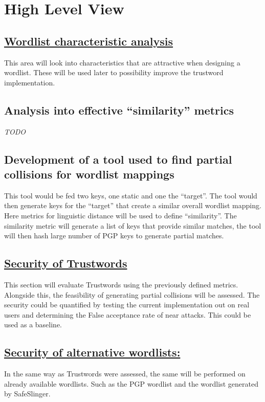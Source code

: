 

\newpage
\section{High Level View}

\subsection*{\hyperref[ref:wordlist]{Wordlist characteristic analysis}}
This area will look into characteristics that are attractive when designing a wordlist. These will be used later to possibility improve the trustword implementation.

\subsection*{Analysis into effective ``similarity'' metrics}
\textit{TODO}

\subsection*{Development of a tool used to find partial collisions for wordlist mappings}
This tool would be fed two keys, one static and one the ``target''. The tool would then generate keys for the ``target'' that create a similar overall wordlist mapping. Here metrics for linguistic distance will be used to define ``similarity''.
The similarity metric will generate a list of keys that provide similar matches, the tool will then hash large number of PGP keys to generate partial matches.


\subsection*{\hyperref[ref:trustwords]{Security of Trustwords}}
This section will evaluate Trustwords using the previously defined metrics. Alongside this, the feasibility of generating partial collisions will be assessed. The security could be quantified by testing the current implementation out on real users and determining the False acceptance rate of near attacks. This could be used as a baseline.  

\subsection*{\hyperref[ref:alternatives]{Security of alternative wordlists:}}
In the same way as Trustwords were assessed, the same will be performed on already available wordlists. Such as the PGP wordlist and the wordlist generated by SafeSlinger.

